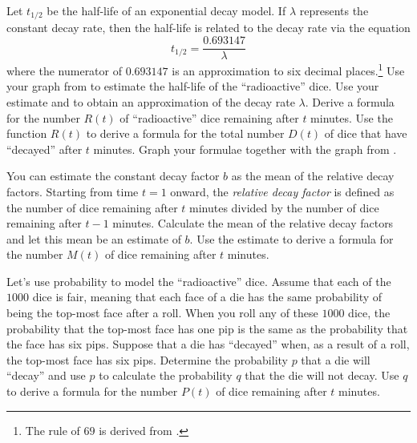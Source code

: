 \documentclass[a4paper,oneside,12pt]{article}
\begin{document}
\begin{problem}
\begin{packedenum}
  \item\label{subprob:radioactive_dice_decay_constant}
    Let $t_{1/2}$ be the half-life of an exponential decay model.  If
    $\lambda$ represents the constant decay rate, then the half-life
    is related to the decay rate via the equation
    \begin{equation}
    \label{eqn:half_life_related_to_decay_rate}
    t_{1/2}
    =
    \frac{0.693147}{\lambda}
    \end{equation}
    where the numerator of $0.693147$ is an approximation to six
    decimal places.\footnote{
      The rule of $69$ is derived from
      .
    }
    Use your graph
    from  to estimate
    the half-life of the ``radioactive'' dice.  Use your estimate and
     to obtain an
    approximation of the decay rate $\lambda$.  Derive a formula for
    the number $R(t)$ of ``radioactive'' dice remaining after $t$
    minutes.  Use the function $R(t)$ to derive a formula for the
    total number $D(t)$ of dice that have ``decayed'' after $t$
    minutes.  Graph your formulae together with the graph
    from .

  \item\label{subprob:radioactive_dice_mean_decay_rate}
    You can estimate the constant decay factor $b$ as the mean of the
    relative decay factors.  Starting from time $t = 1$ onward, the
    \emph{relative decay factor} is defined as the number of dice
    remaining after $t$ minutes divided by the number of dice
    remaining after $t - 1$ minutes.  Calculate the mean of the
    relative decay factors and let this mean be an estimate of $b$.
    Use the estimate to derive a formula for the number  $M(t)$ of
    dice remaining after $t$ minutes.

  \item\label{subprob:radioactive_dice_probability}
    Let's use probability to model the ``radioactive'' dice.  Assume
    that each of the $1000$ dice is fair, meaning that each face of a
    die has the same probability of being the top-most face after a
    roll.  When you roll any of these $1000$ dice, the probability
    that the top-most face has one pip is the same as the probability
    that the face has six pips.  Suppose that a die has ``decayed''
    when, as a result of a roll, the top-most face has six pips.
    Determine the probability $p$ that a die will ``decay'' and use
    $p$ to calculate the probability $q$ that the die will not decay.
    Use $q$ to derive a formula for the number $P(t)$ of dice
    remaining after $t$ minutes.


\end{packedenum}
\end{problem}
\end{document}
